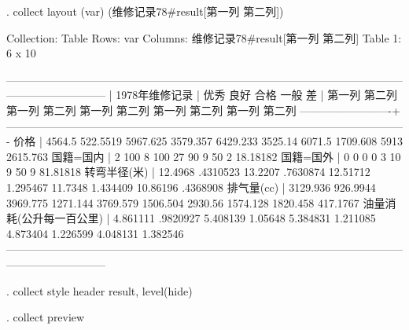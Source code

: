 \documentclass{ctexart}
\begin{document}
. collect layout (var) (维修记录78#result[第一列 第二列])

Collection: Table
      Rows: var
   Columns: 维修记录78#result[第一列 第二列]
   Table 1: 6 x 10

---------------------------------------------------------------------------------------------------------------------------------------
                         |                                                 1978年维修记录                                              
                         |          优秀                  良好                  合格                  一般                   差        
                         |    第一列     第二列     第一列     第二列     第一列     第二列     第一列     第二列     第一列     第二列
-------------------------+-------------------------------------------------------------------------------------------------------------
价格                     |    4564.5   522.5519   5967.625   3579.357   6429.233    3525.14     6071.5   1709.608       5913   2615.763
国籍=国内                |         2        100          8        100         27         90          9         50          2   18.18182
国籍=国外                |         0          0          0          0          3         10          9         50          9   81.81818
转弯半径(米)             |   12.4968   .4310523    13.2207   .7630874   12.51712   1.295467    11.7348   1.434409   10.86196   .4368908
排气量(cc)               |  3129.936   926.9944   3969.775   1271.144   3769.579   1506.504    2930.56   1574.128   1820.458   417.1767
油量消耗(公升每一百公里) |  4.861111   .9820927   5.408139    1.05648   5.384831   1.211085   4.873404   1.226599   4.048131   1.382546
---------------------------------------------------------------------------------------------------------------------------------------

. collect style header result, level(hide)

. collect preview
\end{document}
